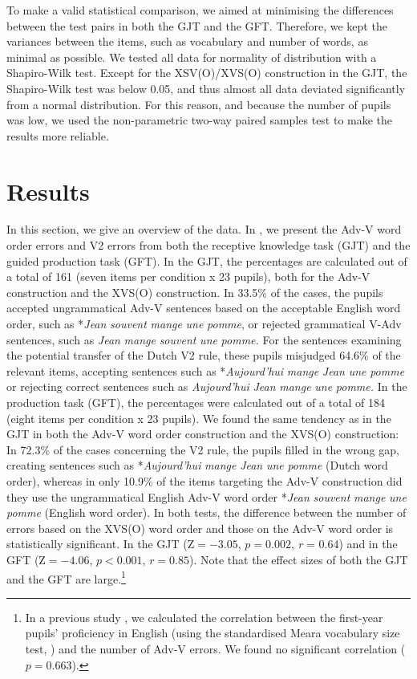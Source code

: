\documentclass[output=paper]{langsci/langscibook}
\begin{document}
To make a valid statistical comparison, we aimed at minimising the differences between the test pairs in both the GJT and the GFT. Therefore, we kept the variances between the items, such as vocabulary and number of words, as minimal as possible. We tested all data for normality of distribution with a Shapiro-Wilk test. Except for the XSV(O)/XVS(O) construction in the GJT, the Shapiro-Wilk test was below 0.05, and thus almost all data deviated significantly from a normal distribution. For this reason, and because the number of pupils was low, we used the non-parametric two-way paired samples test to make the results more reliable.

\section{Results}
\label{sec:stadt:4}

In this section, we give an overview of the data. In , we present the Adv-V word order errors and V2 errors from both the receptive knowledge task (GJT) and the guided production task (GFT). In the GJT, the percentages are calculated out of a total of 161 (seven items per condition x 23 pupils), both for the Adv-V construction and the XVS(O) construction. In 33.5\% of the cases, the pupils accepted ungrammatical Adv-V sentences based on the acceptable English word order, such as *\textit{Jean} \textit{souvent} \textit{mange} \textit{une} \textit{pomme}, or rejected grammatical V-Adv sentences, such as \textit{Jean} \textit{mange} \textit{souvent} \textit{une} \textit{pomme.} For the sentences examining the potential transfer of the Dutch V2 rule, these pupils misjudged 64.6\% of the relevant items, accepting sentences such as *\textit{Aujourd’hui} \textit{mange} \textit{Jean} \textit{une} \textit{pomme} or rejecting correct sentences such as \textit{Aujourd’hui} \textit{Jean} \textit{mange} \textit{une} \textit{pomme.} In the production task (GFT), the percentages were calculated out of a total of 184 (eight items per condition x 23 pupils). We found the same tendency as in the GJT in both the Adv-V word order construction and the XVS(O) construction: In 72.3\% of the cases concerning the V2 rule, the pupils filled in the wrong gap, creating sentences such as *\textit{Aujourd’hui} \textit{mange} \textit{Jean} \textit{une} \textit{pomme} (Dutch word order), whereas in only 10.9\% of the items targeting the Adv-V construction did they use the ungrammatical English Adv-V word order *\textit{Jean} \textit{souvent} \textit{mange} \textit{une} \textit{pomme} (English word order). In both tests, the difference between the number of errors based on the XVS(O) word order and those on the Adv-V word order is statistically significant. In the GJT ($\text{Z} = -3.05$, $p = 0.002$, \textit{r} = 0.64) and in the GFT ($\text{Z} = -4.06$, $p < 0.001$, $r = 0.85$). Note that the effect sizes of both the GJT and the GFT are large.\footnote{In a previous study \citep{StadtEtAl2018Longitudinal}, we calculated the correlation between the first-year pupils’ proficiency in English (using the standardised Meara vocabulary size test, \citealt{Meara2010}) and the number of Adv-V errors. We found no significant correlation ($p = 0.663$).}
\end{document}
